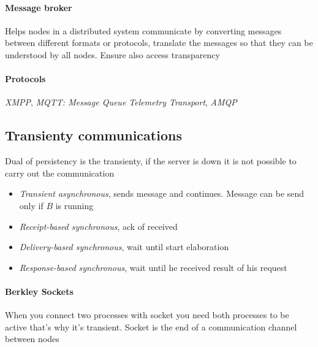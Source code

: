 \paragraph{Message broker}
Helps nodes in a distributed system communicate by converting messages between different formats or protocols, translate the messages so that they can be understood by all nodes. Ensure also access transparency

\paragraph{Protocols} \textit{XMPP}, \textit{MQTT: Message Queue Telemetry Transport}, \textit{AMQP}

\subsection{Transienty communications}
Dual of persistency is the transienty, if the server is down it is not possible to carry out the communication

\begin{itemize}
    \item \textit{Transient asynchronous}, sends message and continues. Message can be send only if $B$ is running
    \item \textit{Receipt-based synchronous}, ack of received
    \item \textit{Delivery-based synchronous},  wait until start elaboration
    \item \textit{Response-based synchronous}, wait until he received result of his request
\end{itemize}

\paragraph{Berkley Sockets}
When you connect two processes with socket you need both processes to be active that’s why it’s transient. Socket is the end of a communication channel between nodes

